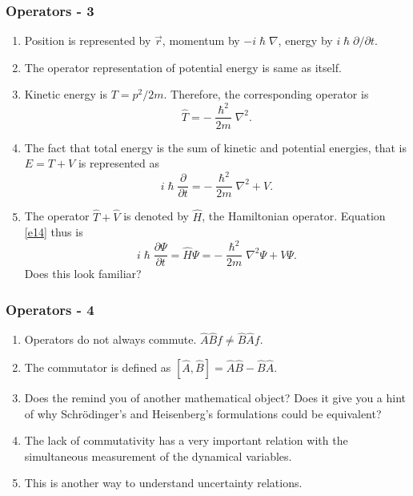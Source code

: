 \documentclass{beamer}
\begin{document}
\begin{frame}
\frametitle{Operators - 3}
\begin{enumerate}
\item Position is represented by $\vec{r}$, momentum by $-i\hslash\nabla$,
energy by $i\hslash\partial/\partial t$.
\item The operator representation of potential energy is same as itself.
\item Kinetic energy is $T = p^2/2m$. Therefore, the corresponding operator is
\begin{equation}\label{e12}
\hat{T} = -\frac{\hslash^2}{2m}\nabla^2.
\end{equation}
\item The fact that total energy is the sum of kinetic and potential energies,
that is $E = T + V$ is represented as
\begin{equation}\label{e13}
i\hslash\frac{\partial}{\partial t} = -\frac{\hslash^2}{2m}\nabla^2 + V.
\end{equation} 
\item The operator $\hat{T} + \hat{V}$ is denoted by $\hat{H}$, the Hamiltonian
operator. Equation \eqref{e14} thus is
\begin{equation}\label{e14}
i\hslash\frac{\partial\Psi}{\partial t} = \hat{H}\Psi = 
-\frac{\hslash^2}{2m}\nabla^2\Psi + V\Psi.
\end{equation}
Does this look familiar? 
\end{enumerate}
\end{frame}

\begin{frame}
\frametitle{Operators - 4}
\begin{enumerate}
\item Operators do not always commute. $\hat{A}\hat{B} f \ne \hat{B}\hat{A} f$.
\item The commutator is defined as $[\hat{A}, \hat{B}] = \hat{A}\hat{B} -
\hat{B}\hat{A}$.
\item Does the remind you of another mathematical object? Does it give you a
hint of why Schr\"{o}dinger's and Heisenberg's formulations could be equivalent?
\item The lack of commutativity has a very important relation with the 
simultaneous measurement of the dynamical variables.
\item This is another way to understand uncertainty relations.
\end{enumerate}
\end{frame}
\end{document}
